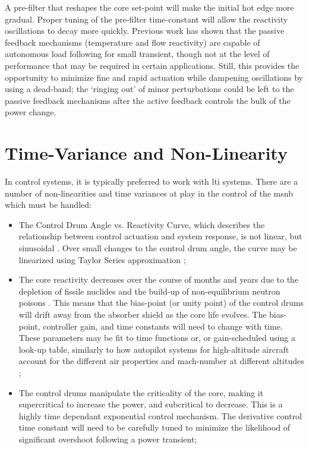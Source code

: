 A pre-filter that reshapes the core set-point will make the initial hot edge more gradual. Proper tuning of the pre-filter time-constant will allow the reactivity oscillations to decay more quickly. Previous work \cite{CarterNumerical} has shown that the passive feedback mechanisms (temperature and flow reactivity) are capable of autonomous load following for small transient, though not at the level of performance that may be required in certain applications. Still, this provides the opportunity to minimize fine and rapid actuation while dampening oscillations by using a dead-band; the `ringing out' of minor perturbations could be left to the passive feedback mechanisms after the active feedback controls the bulk of the power change.

\section{Time-Variance and Non-Linearity}
In control systems, it is typically preferred to work with \acf{lti} systems. There are a number of non-linearities and time variances at play in the control of the \acs{msnb} which must be handled:

\begin{itemize}
    \item The Control Drum Angle vs. Reactivity Curve, which describes the relationship between control actuation and system response, is not linear, but sinusoidal \cite{PetersonMS}. Over small changes to the control drum angle, the curve may be linearized using Taylor Series approximation \cite[Ch. 2]{Bequette};
    \item The core reactivity decreases over the course of months and years due to the depletion of fissile nuclides and the build-up of non-equilibrium neutron poisons \cite[Ch. 7]{Lamarsh}. This means that the bias-point (or unity point) of the control drums will drift away from the absorber shield as the core life evolves. The bias-point, controller gain, and time constants will need to change with time. These parameters may be fit to time functions or, or gain-scheduled using a look-up table, similarly to how autopilot systems for high-altitude aircraft account for the different air properties and mach-number at different altitudes \cite{GainSchedule};
    \item The control drums manipulate the criticality of the core, making it supercritical to increase the power, and subcritical to decrease. This is a highly time dependant exponential control mechanism. The derivative control time constant will need to be carefully tuned to minimize the likelihood of significant overshoot following a power transient; 
\end{itemize}


